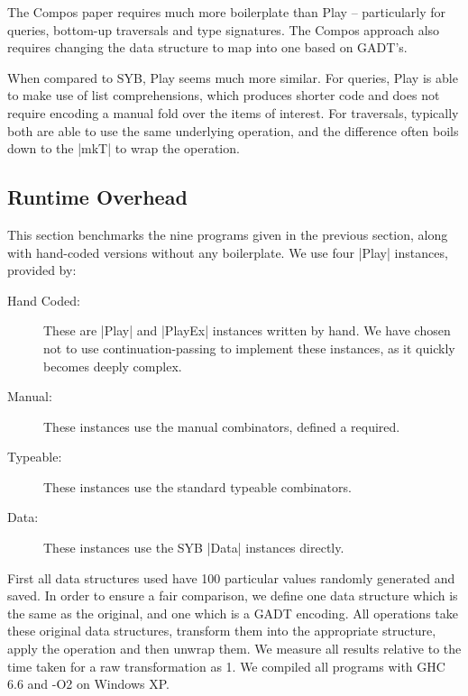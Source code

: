 \documentclass[preprint]{sigplanconf}
\begin{document}
The Compos paper requires much more boilerplate than Play -- particularly for queries, bottom-up traversals and type signatures. The Compos approach also requires changing the data structure to map into one based on GADT's.

When compared to SYB, Play seems much more similar. For queries, Play is able to make use of list comprehensions, which produces shorter code and does not require encoding a manual fold over the items of interest. For traversals, typically both are able to use the same underlying operation, and the difference often boils down to the |mkT| to wrap the operation.


\subsection{Runtime Overhead}
\label{sec:results_speed}

This section benchmarks the nine programs given in the previous section, along with hand-coded versions without any boilerplate. We use four |Play| instances, provided by:

\begin{description}
\item[Hand Coded:] These are |Play| and |PlayEx| instances written by hand. We have chosen not to use continuation-passing to implement these instances, as it quickly becomes deeply complex.
\item[Manual:] These instances use the manual combinators, defined a required.
\item[Typeable:] These instances use the standard typeable combinators.
\item[Data:] These instances use the SYB |Data| instances directly.
\end{description}

First all data structures used have 100 particular values randomly generated and saved. In order to ensure a fair comparison, we define one data structure which is the same as the original, and one which is a GADT encoding. All operations take these original data structures, transform them into the appropriate structure, apply the operation and then unwrap them. We measure all results relative to the time taken for a raw transformation as 1. We compiled all programs with GHC 6.6 and -O2 on Windows XP.
\end{document}

